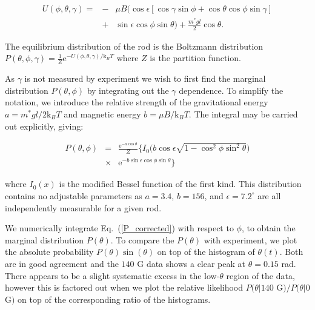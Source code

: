 \documentclass[aps,prl,twocolumn,superscriptaddress]{revtex4-1}
\newcommand{\ssc}[0]{\sin{\gamma}}
\newcommand{\ccc}[0]{\cos{\gamma}}
\newcommand{\cct}[0]{\cos{\theta}}
\newcommand{\ssp}[0]{\sin{\phi}}
\newcommand{\ccp}[0]{\cos{\phi}}
\newcommand{\ee}{\mathrm{e}}
\newcommand{\kk}{\mathrm{k}_B}
\begin{document}
\begin{eqnarray}
U(\phi,\theta,\gamma)  = & - & \mu B \Big( \cos\epsilon [\ccc\ssp + \cct\ccp\ssc] \nonumber \\
& + & \sin\epsilon \cos\phi\sin\theta \Big) + \frac{m^*gl}{2} \cct.
\end{eqnarray}

The equilibrium distribution of the rod is the Boltzmann distribution $P(\theta, \phi, \gamma)  =  \frac{1}{Z} \ee^{ -U(\phi, \theta, \gamma)/\kk T }$ where $Z$ is the partition function.


As $\gamma$ is not measured by experiment we wish to first find the marginal distribution $P(\theta,\phi)$ by integrating out the $\gamma$ dependence. To simplify the notation, we introduce the relative strength of the gravitational energy $a=m^*gl/2 \kk T$ and magnetic energy $b=\mu B/\kk T$. The integral may be carried out explicitly, giving:


\begin{eqnarray}\label{corrected}
P(\theta,\phi)  & = & \frac{\ee^{-a\cos\theta}}{Z} \Big\{ I_0\Big( b\cos\epsilon\sqrt{1-\cos^2\phi\sin^2\theta} \Big) \nonumber\\
& \times &  \ee^{-b \sin\epsilon \cos\phi\sin\theta}\Big\} \label{P_corrected}
\end{eqnarray}

where $I_0(x)$ is the modified Bessel function of the first kind. This distribution contains no adjustable parameters as $a=3.4$, $b=156$, and $\epsilon=7.2^\circ$ are all independently measurable for a given rod.




We numerically integrate Eq.\ (\ref{P_corrected}) with respect to $\phi$, to obtain the marginal distribution $P(\theta)$. To compare the $P(\theta)$ with experiment, we plot the absolute probability $P(\theta)\sin(\theta)$ on top of the histogram of $\theta(t)$. Both are in good agreement and the $140$ G data shows a clear peak at $\theta=0.15$ rad. There appears to be a slight systematic excess in the low-$\theta$ region of the data, however this is factored out when we plot the relative likelihood $P(\theta | 140$ G$)/P(\theta | 0$ G$)$ on top of the corresponding ratio of the histograms. 
\end{document}
